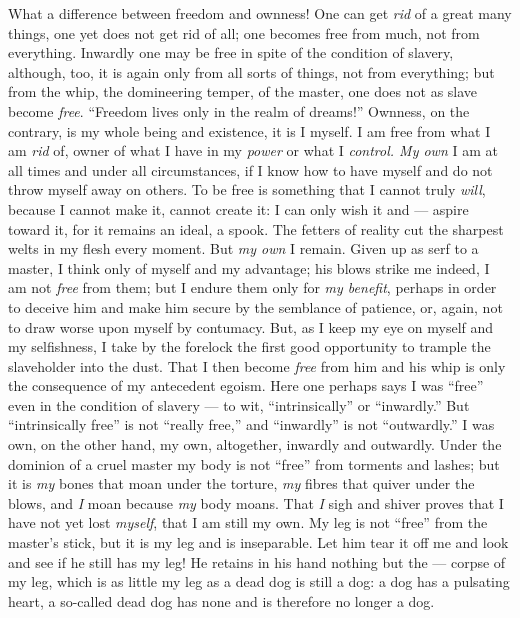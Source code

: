What a difference between freedom and ownness! One can get \textit{rid} of a 
great many things, one yet does not get rid of all; one becomes free from 
much, not from everything. Inwardly one may be free in spite of the condition 
of slavery, although, too, it is again only from all sorts of things, not from 
everything; but from the whip, the domineering temper, of the master, one does 
not as slave become \textit{free}. ``Freedom lives only in the realm of 
dreams!'' Ownness, on the contrary, is my whole being and existence, it is I 
myself. I am free from what I am \textit{rid} of, owner of what I have in my 
\textit{power} or what I \textit{control. My own} I am at all times and under 
all circumstances, if I know how to have myself and do not throw myself away 
on others. To be free is something that I cannot truly \textit{will}, because 
I cannot make it, cannot create it: I can only wish it and --- aspire toward 
it, for it remains an ideal, a spook. The fetters of reality cut the sharpest 
welts in my flesh every moment. But \textit{my own} I remain. Given up as serf 
to a master, I think only of myself and my advantage; his blows strike me 
indeed, I am not \textit{free} from them; but I endure them only for 
\textit{my benefit}, perhaps in order to deceive him and make him secure by 
the semblance of patience, or, again, not to draw worse upon myself by 
contumacy. But, as I keep my eye on myself and my selfishness, I take by the 
forelock the first good opportunity to trample the slaveholder into the dust. 
That I then become \textit{free} from him and his whip is only the consequence 
of my antecedent egoism. Here one perhaps says I was ``free'' even in the 
condition of slavery --- to wit, ``intrinsically'' or ``inwardly.'' But 
``intrinsically free'' is not ``really free,'' and ``inwardly'' is not 
``outwardly.'' I was own, on the other hand, my own, altogether, inwardly 
and outwardly. Under the dominion of a cruel master my body is not ``free'' 
from torments and lashes; but it is \textit{my} bones that moan under the 
torture, \textit{my} fibres that quiver under the blows, and \textit{I} moan 
because \textit{my} body moans. That \textit{I} sigh and shiver proves that I 
have not yet lost \textit{myself}, that I am still my own. My leg is not 
``free'' from the master's stick, but it is my leg and is inseparable. Let 
him tear it off me and look and see if he still has my leg! He retains in his 
hand nothing but the --- corpse of my leg, which is as little my leg as a dead 
dog is still a dog: a dog has a pulsating heart, a so-called dead dog has none 
and is therefore no longer a dog.

